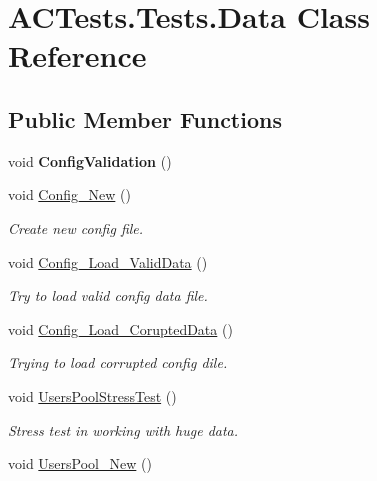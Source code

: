 \hypertarget{class_a_c_tests_1_1_tests_1_1_data}{}\section{A\+C\+Tests.\+Tests.\+Data Class Reference}
\label{class_a_c_tests_1_1_tests_1_1_data}
\subsection*{Public Member Functions}
\begin{DoxyCompactItemize}
\item 
\mbox{\label{class_a_c_tests_1_1_tests_1_1_data_a2552730dfd36f256d7a6126101d146fd}} 
void {\bfseries Config\+Validation} ()
\item 
void \mbox{\hyperlink{class_a_c_tests_1_1_tests_1_1_data_aad3d42245f0a8aefd1a3aeefa1a6a4b4}{Config\+\_\+\+New}} ()
\begin{DoxyCompactList}\small\item\em Create new config file. \end{DoxyCompactList}\item 
void \mbox{\hyperlink{class_a_c_tests_1_1_tests_1_1_data_a60970a44b261e13c936a0f0f818c783c}{Config\+\_\+\+Load\+\_\+\+Valid\+Data}} ()
\begin{DoxyCompactList}\small\item\em Try to load valid config data file. \end{DoxyCompactList}\item 
void \mbox{\hyperlink{class_a_c_tests_1_1_tests_1_1_data_a72c6a9bf21087e790ecf8334e9c65eef}{Config\+\_\+\+Load\+\_\+\+Corupted\+Data}} ()
\begin{DoxyCompactList}\small\item\em Trying to load corrupted config dile. \end{DoxyCompactList}\item 
void \mbox{\hyperlink{class_a_c_tests_1_1_tests_1_1_data_a237c73f81e488349c5518159f0ee2841}{Users\+Pool\+Stress\+Test}} ()
\begin{DoxyCompactList}\small\item\em Stress test in working with huge data. \end{DoxyCompactList}\item 
void \mbox{\hyperlink{class_a_c_tests_1_1_tests_1_1_data_ab5c9695f229e23ce3cc23f98a636d5e5}{Users\+Pool\+\_\+\+New}} ()

\end{DoxyCompactItemize}
